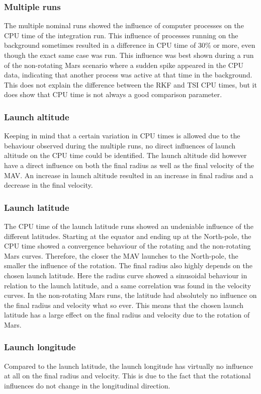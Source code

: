 \subsubsection{Multiple runs}
The multiple nominal runs showed the influence of computer processes on the CPU time of the integration run. This influence of processes running on the background sometimes resulted in a difference in CPU time of 30\% or more, even though the exact same case was run. This influence was best shown during a run of the non-rotating Mars scenario where a sudden spike appeared in the CPU data, indicating that another process was active at that time in the background. This does not explain the difference between the \ac{RKF} and \ac{TSI} CPU times, but it does show that CPU time is not always a good comparison parameter.


\subsubsection{Launch altitude}
Keeping in mind that a certain variation in CPU times is allowed due to the behaviour observed during the multiple runs, no direct influences of launch altitude on the CPU time could be identified. The launch altitude did however have a direct influence on both the final radius as well as the final velocity of the \ac{MAV}. An increase in launch altitude resulted in an increase in final radius and a decrease in the final velocity. 

\subsubsection{Launch latitude}
The CPU time of the launch latitude runs showed an undeniable influence of the different latitudes. Starting at the equator and ending up at the North-pole, the CPU time showed a convergence behaviour of the rotating and the non-rotating Mars curves. Therefore, the closer the \ac{MAV} launches to the North-pole, the smaller the influence of the rotation. The final radius also highly depends on the chosen launch latitude. Here the radius curve showed a sinusoidal behaviour in relation to the launch latitude, and a same correlation was found in the velocity curves. In the non-rotating Mars runs, the latitude had absolutely no influence on the final radius and velocity what so ever. This means that the chosen launch latitude has a large effect on the final radius and velocity due to the rotation of Mars. 


\subsubsection{Launch longitude}
Compared to the launch latitude, the launch longitude has virtually no influence at all on the final radius and velocity. This is due to the fact that the rotational influences do not change in the longitudinal direction. 

